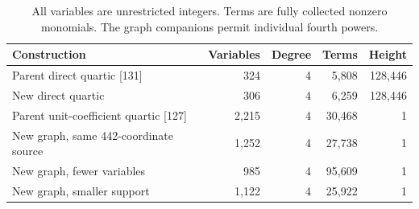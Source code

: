\begin{table}[ht]
\centering\small
\begin{tabular}{@{}p{}rrrr@{}}\toprule
Construction & Variables & Degree & Terms & Height\\\midrule
Parent direct quartic [131] & 324 & 4 & 5{,}808 & 128{,}446\\
New direct quartic & 306 & 4 & 6{,}259 & 128{,}446\\
Parent unit-coefficient quartic [127] & 2{,}215 & 4 & 30{,}468 & 1\\
New graph, same 442-coordinate source & 1{,}252 & 4 & 27{,}738 & 1\\
New graph, fewer variables & 985 & 4 & 95{,}609 & 1\\
New graph, smaller support & 1{,}122 & 4 & 25{,}922 & 1\\
\bottomrule\end{tabular}
\caption{All variables are unrestricted integers. Terms are fully collected nonzero monomials. The graph companions permit individual fourth powers.}
\label{tab:metrics}\end{table}
